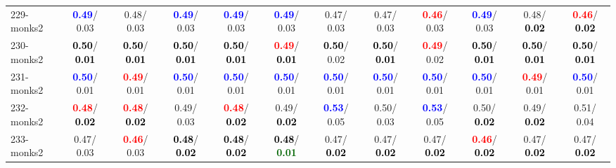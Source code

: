 \begin{table}[h]
\begin{center}
{\begin{tabular}{lc|c|c|c|c|c|c|c|c|c|c}
229-monks2 & \textcolor{blue}{\textbf{  0.49}}/  0.03 &   0.48/  0.03 & \textcolor{blue}{\textbf{  0.49}}/  0.03 & \textcolor{blue}{\textbf{  0.49}}/  0.03 & \textcolor{blue}{\textbf{  0.49}}/  0.03 &   0.47/  0.03 &   0.47/  0.03 & \textcolor{red}{\textbf{  0.46}}/  0.03 & \textcolor{blue}{\textbf{  0.49}}/  0.03 &   0.48/\textcolor{black}{\textbf{  0.02}} & \textcolor{red}{\textbf{  0.46}}/\textcolor{black}{\textbf{  0.02}} \\
230-monks2 & \textcolor{black}{\textbf{  0.50}}/\textcolor{black}{\textbf{  0.01}} & \textcolor{black}{\textbf{  0.50}}/\textcolor{black}{\textbf{  0.01}} & \textcolor{black}{\textbf{  0.50}}/\textcolor{black}{\textbf{  0.01}} & \textcolor{black}{\textbf{  0.50}}/\textcolor{black}{\textbf{  0.01}} & \textcolor{red}{\textbf{  0.49}}/\textcolor{black}{\textbf{  0.01}} & \textcolor{black}{\textbf{  0.50}}/  0.02 & \textcolor{black}{\textbf{  0.50}}/\textcolor{black}{\textbf{  0.01}} & \textcolor{red}{\textbf{  0.49}}/  0.02 & \textcolor{black}{\textbf{  0.50}}/\textcolor{black}{\textbf{  0.01}} & \textcolor{black}{\textbf{  0.50}}/\textcolor{black}{\textbf{  0.01}} & \textcolor{black}{\textbf{  0.50}}/\textcolor{black}{\textbf{  0.01}} \\
231-monks2 & \textcolor{blue}{\textbf{  0.50}}/  0.01 & \textcolor{red}{\textbf{  0.49}}/  0.01 & \textcolor{blue}{\textbf{  0.50}}/  0.01 & \textcolor{blue}{\textbf{  0.50}}/  0.01 & \textcolor{blue}{\textbf{  0.50}}/  0.01 & \textcolor{blue}{\textbf{  0.50}}/  0.01 & \textcolor{blue}{\textbf{  0.50}}/  0.01 & \textcolor{blue}{\textbf{  0.50}}/  0.01 & \textcolor{blue}{\textbf{  0.50}}/  0.01 & \textcolor{red}{\textbf{  0.49}}/  0.01 & \textcolor{blue}{\textbf{  0.50}}/  0.01 \\ \hline
232-monks2 & \textcolor{red}{\textbf{  0.48}}/\textcolor{black}{\textbf{  0.02}} & \textcolor{red}{\textbf{  0.48}}/\textcolor{black}{\textbf{  0.02}} &   0.49/  0.03 & \textcolor{red}{\textbf{  0.48}}/\textcolor{black}{\textbf{  0.02}} &   0.49/\textcolor{black}{\textbf{  0.02}} & \textcolor{blue}{\textbf{  0.53}}/  0.05 &   0.50/  0.03 & \textcolor{blue}{\textbf{  0.53}}/  0.05 &   0.50/\textcolor{black}{\textbf{  0.02}} &   0.49/\textcolor{black}{\textbf{  0.02}} &   0.51/  0.04 \\
233-monks2 &   0.47/  0.03 & \textcolor{red}{\textbf{  0.46}}/  0.03 & \textcolor{black}{\textbf{  0.48}}/\textcolor{black}{\textbf{  0.02}} & \textcolor{black}{\textbf{  0.48}}/\textcolor{black}{\textbf{  0.02}} & \textcolor{black}{\textbf{  0.48}}/\textcolor{darkgreen}{\textbf{  0.01}} &   0.47/\textcolor{black}{\textbf{  0.02}} &   0.47/\textcolor{black}{\textbf{  0.02}} &   0.47/\textcolor{black}{\textbf{  0.02}} & \textcolor{red}{\textbf{  0.46}}/\textcolor{black}{\textbf{  0.02}} &   0.47/\textcolor{black}{\textbf{  0.02}} &   0.47/\textcolor{black}{\textbf{  0.02}} \\

\end{tabular}}
\end{center}
\end{table}
